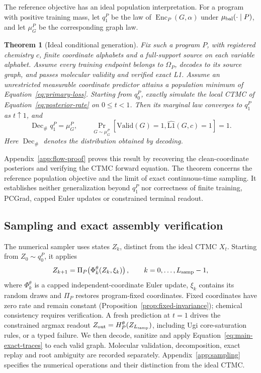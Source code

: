 \documentclass{article}
\newtheorem{theorem}{Theorem}[section]
\theoremstyle{definition}
\begin{document}
The reference objective has an ideal population interpretation. For a program with positive training
mass, let $q_1^P$ be the law of $\operatorname{Enc}_P(G,\alpha)$ under $\mu_{\rm bal}(\cdot\mid P)$,
and let $\mu_G^P$ be the corresponding graph law.
\begin{theorem}[Ideal conditional generation]
\label{thm:ideal-terminal-law}
Fix such a program $P$, with registered chemistry $c$, finite coordinate alphabets and a
full-support source on each variable alphabet. Assume every training endpoint belongs to $\Omega_P$, decodes to its source
graph, and passes molecular validity and verified exact L1. Assume an unrestricted measurable
coordinate predictor attains a population minimum of Equation~\ref{eq:primary-loss}. Starting from $q_0^P$, exactly simulate the local CTMC
of Equation~\ref{eq:posterior-rate} on $0\leq t<1$. Then its marginal law converges to $q_1^P$ as
$t\uparrow1$, and
\begin{equation}
 \operatorname{Dec}_{\#}q_1^P=\mu_G^P,\qquad
 \Pr_{G\sim\mu_G^P}\!\left[\mathrm{Valid}(G)=1,
 \widehat{\mathrm{L1}}(G,c)=1\right]=1.
\end{equation}
Here $\operatorname{Dec}_{\#}$ denotes the distribution obtained by decoding.
\end{theorem}
Appendix~\ref{app:flow-proof} proves this result by recovering the clean-coordinate posteriors and
verifying the CTMC forward equation. The theorem concerns the reference population objective and the
limit of exact continuous-time sampling. It establishes neither generalization beyond $q_1^P$ nor
correctness of finite training, PCGrad, capped Euler updates or constrained terminal readout.

\subsection{Sampling and exact assembly verification}
\label{sec:sampling-verification}
The numerical sampler uses states $Z_k$, distinct from the ideal CTMC $X_t$. Starting from
$Z_0\sim q_0^P$, it applies
\begin{equation}
 Z_{k+1}=\Pi_P\!\left(\Phi_k^\theta(Z_k,\xi_k)\right),
 \qquad k=0,\ldots,L_{\rm samp}-1,
 \label{eq:numerical-sampling}
\end{equation}
where $\Phi_k^\theta$ is a capped independent-coordinate Euler update, $\xi_k$ contains its random
draws and $\Pi_P$ restores program-fixed coordinates. Fixed coordinates have zero rate and remain
constant (Proposition~\ref{prop:fixed-invariance}); chemical consistency requires verification.
A fresh prediction at $t=1$ drives the constrained argmax readout
$Z_{\rm out}=H_P^\theta(Z_{L_{\rm samp}})$, including Ugi core-saturation rules, or a typed failure.
We then decode, sanitize and apply Equation~\ref{eq:main-exact-traces} to each valid graph.
Molecular validation, decomposition, exact replay and root ambiguity are recorded separately.
Appendix~\ref{app:sampling} specifies the numerical operations and their distinction from the ideal
CTMC.
\end{document}
